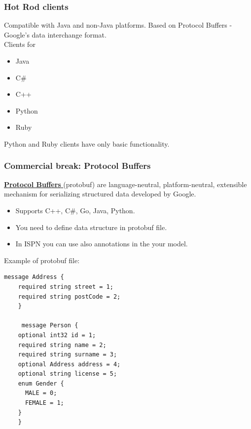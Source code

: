 \documentclass[10pt,utf8]{beamer}
\begin{document}
\begin{frame}
  \frametitle{Hot Rod clients}
	Compatible with Java and non-Java platforms. Based on Protocol Buffers - Google's data interchange format.\\
	\vspace{0.5cm}
	Clients for
	\begin{itemize}
		\item Java
		\item C\#
		\item C++
		\item Python
		\item Ruby
	\end{itemize}
	Python and Ruby clients have only basic functionality.
\end{frame}

\begin{frame}[fragile]
	\frametitle{Commercial break: Protocol Buffers}
	\href{https://developers.google.com/protocol-buffers/}{\color{blue}\textbf{Protocol Buffers }} (protobuf) are language-neutral, platform-neutral, extensible mechanism for serializing 
	structured data developed by Google. \\ 
	\vspace{0.1cm}
	
	\begin{itemize}
		\item Supports C++, C\#, Go, Java, Python.
		\item You need to define data structure in protobuf file.
		\item In ISPN you can use also annotations in the your model.
	\end{itemize}
	
	Example of protobuf file:
	\begin{lstlisting}[style=Protobuf] 
	message Address {
    required string street = 1;
    required string postCode = 2;
	}

	 message Person {
    optional int32 id = 1;
    required string name = 2;
    required string surname = 3;
    optional Address address = 4;
    optional string license = 5;
    enum Gender {
      MALE = 0;
      FEMALE = 1;
    }                                                                                                                                                                                                                                         
	}                
	\end{lstlisting}
\end{frame}
\end{document}
